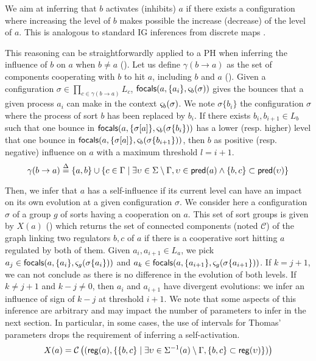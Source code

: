 We aim at inferring that $b$ activates (inhibits) $a$ if there exists a configuration where increasing
the level of $b$ makes possible the increase (decrease) of the level of $a$.
This is analogous to standard IG inferences from discrete maps \cite{RiCo07}.

This reasoning can be straightforwardly applied to a PH when inferring the influence of $b$ on $a$
when $b\neq a$ ().
Let us define $\gamma(b\rightarrow a)$ as the set of components cooperating with $b$ to hit $a$,
including $b$ and $a$ ().
Given a configuration $\sigma\in\prod_{c\in\gamma(b\rightarrow a)} L_c$, 
$\mathsf{focals}(a,\{a_i\},\varsigma_b(\sigma))$ gives the bounces that a given process $a_i$ can make in the
context $\varsigma_b(\sigma)$.
We note $\sigma\{b_i\}$ the configuration $\sigma$ where the process of sort $b$ has been replaced
by $b_i$.
If there exists $b_i,b_{i+1}\in L_b$ such that one bounce in 
$\mathsf{focals}(a, \{\sigma[a]\}, \varsigma_b(\sigma\{b_i\}))$
has a lower (resp. higher) level that one bounce in
$\mathsf{focals}(a, \{\sigma[a]\}, \varsigma_b(\sigma\{b_{i+1}\}))$, then
$b$ as positive (resp. negative) influence on $a$ with a maximum threshold $l=i+1$.
\begin{equation}
\gamma(b\rightarrow a)  \stackrel{\Delta}= \{ a, b \} \cup \{ c \in \Gamma \mid 
			\exists \upsilon\in\Sigma\setminus\Gamma,
				\upsilon\in\mathsf{pred}(a) \wedge \{b,c\}\subset\mathsf{pred}(\upsilon) \}
\label{eq:cooperating-with-b}
\end{equation}


Then, we infer that $a$ has a self-influence if its current level can have an impact on its own
evolution at a given configuration $\sigma$.
We consider here a configuration $\sigma$ of a group $g$ of sorts having a cooperation on $a$.
This set of sort groups is given by $X(a)$ () which returns the set of
connected components (noted $\mathcal C$) of the graph linking two regulators $b,c$ of $a$ if there
is a cooperative sort hitting $a$ regulated by both of them.
Given $a_i,a_{i+1}\in L_a$, we pick $a_j\in\mathsf{focals}(a,\{a_i\},\varsigma_g(\sigma\{a_i\}))$ and
$a_k\in\mathsf{focals}(a,\{a_{i+1}\},\varsigma_g(\sigma\{a_{i+1}\}))$.
If $k=j+1$, we can not conclude as there is no difference in the evolution of both levels.
If $k\neq j+1$ and $k-j\neq 0$, then $a_i$ and $a_{i+1}$ have divergent evolutions: we infer an
influence of sign of $k-j$ at threshold $i+1$.
We note that some aspects of this inference are arbitrary and may impact the number of parameters to
infer in the next section.
In particular, in some cases, the use of intervals for Thomas' parameters drops the requirement of
inferring a self-activation.
\begin{equation}
X(a) = \mathcal C\left( (\mathsf{reg}({a}), \{ \{b,c\} \mid
				\exists \upsilon\in \Sigma^{-1}(a) \setminus \Gamma,
					\{b,c\} \subset \mathsf{reg}({\upsilon}) \}) \right)
\label{eq:influence-groups}
\end{equation}

